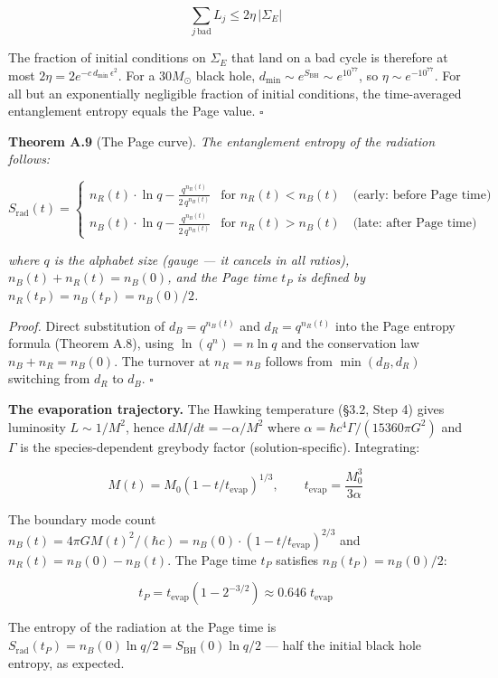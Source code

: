 \documentclass[
]{article}
\begin{document}
\[\sum_{j \,\text{bad}} L_j \leq 2\eta\,|\Sigma_E|\]

The fraction of initial conditions on \(\Sigma_E\) that land on a bad
cycle is therefore at most
\(2\eta = 2e^{-c \, d_{\min} \, \epsilon^2}\). For a \(30 M_\odot\)
black hole, \(d_{\min} \sim e^{S_{\text{BH}}} \sim e^{10^{77}}\), so
\(\eta \sim e^{-10^{77}}\). For all but an exponentially negligible
fraction of initial conditions, the time-averaged entanglement entropy
equals the Page value. \(\square\)

\textbf{Theorem A.9} (The Page curve). \emph{The entanglement entropy of
the radiation follows:}

\[S_{\text{rad}}(t) = \begin{cases} n_R(t) \cdot \ln q - \frac{q^{n_R(t)}}{2\,q^{n_B(t)}} & \text{for } n_R(t) < n_B(t) \quad \text{(early: before Page time)} \\ n_B(t) \cdot \ln q - \frac{q^{n_B(t)}}{2\,q^{n_R(t)}} & \text{for } n_R(t) > n_B(t) \quad \text{(late: after Page time)} \end{cases}\]

\emph{where \(q\) is the alphabet size (gauge --- it cancels in all
ratios), \(n_B(t) + n_R(t) = n_B(0)\), and the Page time \(t_P\) is
defined by \(n_R(t_P) = n_B(t_P) = n_B(0)/2\).}

\emph{Proof.} Direct substitution of \(d_B = q^{n_B(t)}\) and
\(d_R = q^{n_R(t)}\) into the Page entropy formula (Theorem A.8), using
\(\ln(q^n) = n \ln q\) and the conservation law \(n_B + n_R = n_B(0)\).
The turnover at \(n_R = n_B\) follows from \(\min(d_B, d_R)\) switching
from \(d_R\) to \(d_B\). \(\square\)

\textbf{The evaporation trajectory.} The Hawking temperature (§3.2, Step
4) gives luminosity \(L \sim 1/M^2\), hence \(dM/dt = -\alpha/M^2\)
where \(\alpha = \hbar c^4 \Gamma / (15360 \pi G^2)\) and \(\Gamma\) is
the species-dependent greybody factor (solution-specific). Integrating:

\[M(t) = M_0\!\left(1 - t/t_{\text{evap}}\right)^{1/3}, \qquad t_{\text{evap}} = \frac{M_0^3}{3\alpha}\]

The boundary mode count
\(n_B(t) = 4\pi G M(t)^2 / (\hbar c) = n_B(0) \cdot (1 - t/t_{\text{evap}})^{2/3}\)
and \(n_R(t) = n_B(0) - n_B(t)\). The Page time \(t_P\) satisfies
\(n_B(t_P) = n_B(0)/2\):

\[t_P = t_{\text{evap}}\!\left(1 - 2^{-3/2}\right) \approx 0.646 \; t_{\text{evap}}\]

The entropy of the radiation at the Page time is
\(S_{\text{rad}}(t_P) = n_B(0) \ln q / 2 = S_{\text{BH}}(0) \ln q / 2\)
--- half the initial black hole entropy, as expected.
\end{document}
